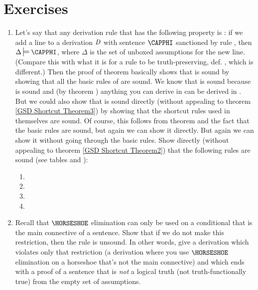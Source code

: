 \section{Exercises}

\begin{enumerate}
\item Let's say that any derivation rule  that has the following property is : if we add a line to a derivation $\mathit{D}$ with sentence $\CAPPHI$ sanctioned by rule , then $\Delta\sdtstile{}{}\CAPPHI$, where $\Delta$ is the set of unboxed assumptions for the new line. 
(Compare this with what it is for a rule to be truth-preserving, def. , which is different.)
Then the proof of theorem  basically shows that \GSD{} is sound by showing that all the basic rules of \GSD{} are sound. 
We know that \GSDP{} is sound because \GSD{} is sound and (by theorem ) anything you can derive in \GSDP{} can be derived in \GSD{}. 
But we could also show that \GSDP{} is sound directly (without appealing to theorem \ref{GSD Shortcut Theorem3}) by showing that the shortcut rules used in \GSDP{} themselves are sound. 
Of course, this follows from theorem  and the fact that the basic rules are sound, but again we can show it directly. 
But again we can show it without going through the basic rules.
Show directly (without appealing to theorem \ref{GSD Shortcut Theorem2}) that the following rules are sound (see tables  and ): 
\begin{multicols}{2}
\begin{enumerate}
\item {}
\item {}
\item {}
\item {}
\end{enumerate}
\end{multicols} 
\item Recall that $\HORSESHOE$ elimination can only be used on a conditional that is the main connective of a sentence. Show that if we do not make this restriction, then the rule is unsound. In other words, give a derivation which violates only that restriction (a derivation where you use $\HORSESHOE$ elimination on a horseshoe that's not the main connective) and which ends with a proof of a sentence that is \emph{not} a logical truth (not truth-functionally true) from the empty set of assumptions.
\end{enumerate}

